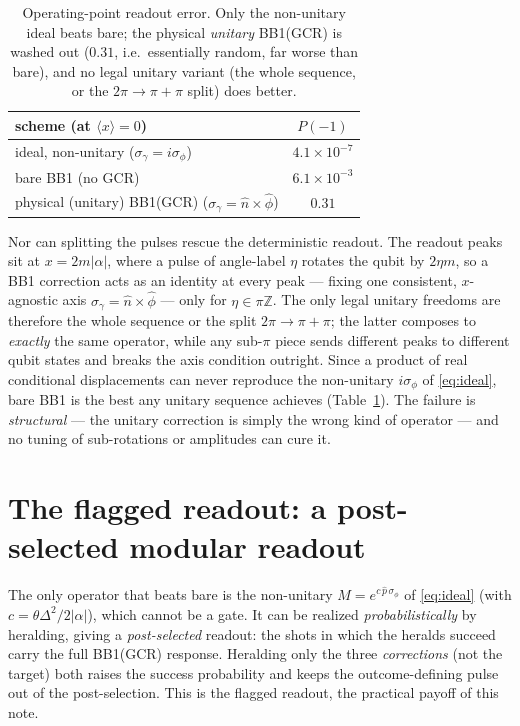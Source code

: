 \documentclass[11pt]{article}
\begin{document}
\begin{table}[h]
\centering
\begin{tabular}{lc}
\toprule
scheme (at $\langle x\rangle=0$) & $P(-1)$ \\
\midrule
ideal, non-unitary ($\sigma_\gamma=i\sigma_\phi$) & $4.1\times10^{-7}$ \\
bare BB1 (no GCR) & $6.1\times10^{-3}$ \\
physical (unitary) BB1(GCR) ($\sigma_\gamma=\hat n\times\hat\phi$) & $0.31$ \\
\bottomrule
\end{tabular}
\caption{Operating-point readout error. Only the non-unitary ideal beats bare; the physical
\emph{unitary} BB1(GCR) is washed out ($0.31$, i.e.\ essentially random, far worse than bare), and no
legal unitary variant (the whole sequence, or the $2\pi\to\pi+\pi$ split) does better.}
\label{tab:cases}
\end{table}

Nor can splitting the pulses rescue the deterministic readout. The readout peaks sit at
$x=2m|\alpha|$, where a pulse of angle-label $\eta$ rotates the qubit by $2\eta m$, so a BB1 correction
acts as an identity at every peak --- fixing one consistent, $x$-agnostic axis
$\sigma_\gamma=\hat n\times\hat\phi$ --- only for $\eta\in\pi\mathbb{Z}$. The only legal unitary
freedoms are therefore the whole sequence or the split $2\pi\to\pi+\pi$; the latter composes to
\emph{exactly} the same operator, while any sub-$\pi$ piece sends different peaks to different qubit
states and breaks the axis condition outright. Since a product of real conditional displacements can
never reproduce the non-unitary $i\sigma_\phi$ of \eqref{eq:ideal}, bare BB1 is the best any unitary
sequence achieves (Table~\ref{tab:cases}). The failure is \emph{structural} --- the unitary correction
is simply the wrong kind of operator --- and no tuning of sub-rotations or amplitudes can cure it.

\section{The flagged readout: a post-selected modular readout}\label{sec:flagged}
The only operator that beats bare is the non-unitary $M=e^{c\,\hat p\,\sigma_\phi}$ of
\eqref{eq:ideal} (with $c=\theta\Delta^2/2|\alpha|$), which cannot be a gate. It can be realized
\emph{probabilistically} by heralding, giving a \emph{post-selected} readout: the shots in which the
heralds succeed carry the full BB1(GCR) response. Heralding only the three \emph{corrections} (not the
target) both raises the success probability and keeps the outcome-defining pulse out of the
post-selection. This is the flagged readout, the practical payoff of this note.
\end{document}
